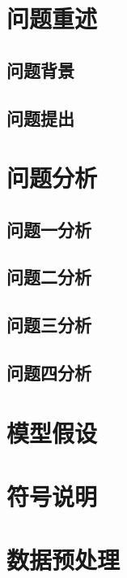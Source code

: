 \documentclass[withoutpreface,bwprint]{cumcmthesis}
\title{}  %
\begin{document}
	
	\maketitle
	\begin{abstract}
		
		\textbf{关键词：{}}
	\end{abstract}
	
	
	\section{问题重述}
	\subsection{问题背景}
	\subsection{问题提出}
	\section{问题分析}
	\subsection{问题一分析}
	\subsection{问题二分析}
	\subsection{问题三分析}
	\subsection{问题四分析}
	\section{模型假设}
	\section{符号说明}
	\section{数据预处理}
\end{document}
